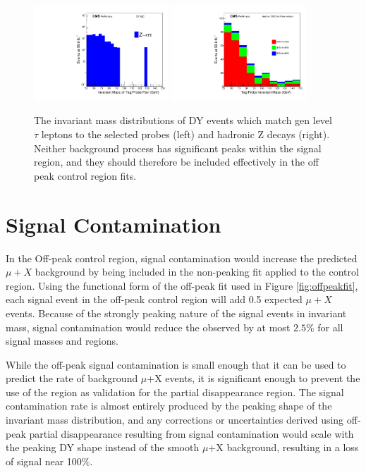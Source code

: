\begin{figure}[htp]
    \centering
    \includegraphics[width=0.45\textwidth]{figures/tauZInvMass.pdf}
    \includegraphics[width=0.45\textwidth]{figures/hadronZInvMass.pdf}
     \caption[The invariant mass of hadronic and $\tau$ Z decays]{The invariant mass distributions of DY events which match gen level $\tau$ leptons to the selected probes (left) and hadronic Z decays (right). Neither background process has significant peaks within the signal region, and they should therefore be included effectively in the off peak control region fits.}
    \label{fig:ZtoTauTau}
\end{figure}

\section{Signal Contamination}
\label{sec:SigContamination}
In the Off-peak control region, signal contamination would increase the predicted $\mu+X$ background by being included in the non-peaking fit applied to the control region. Using the functional form of the off-peak fit used in Figure \ref{fig:offpeakfit}, each signal event in the off-peak control region will add 0.5 expected $\mu+X$ events. Because of the strongly peaking nature of the signal events in invariant mass, signal contamination would reduce the observed by at most $2.5\%$ for all signal masses and regions.

While the off-peak signal contamination is small enough that it can be used to predict the rate of background $\mu$+X events, it is significant enough to prevent the use of the region as validation for the partial disappearance region. The signal contamination rate is almost entirely produced by the peaking shape of the invariant mass distribution, and any corrections or uncertainties derived using off-peak partial disappearance resulting from signal contamination would scale with the peaking DY shape instead of the smooth $\mu$+X background, resulting in a loss of signal near 100$\%$.

